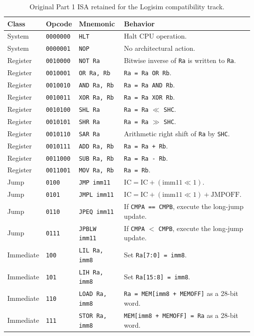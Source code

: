 \documentclass[12pt,a4paper]{article}
\begin{document}
\begin{table}[H]
\centering
\small
\caption{Original Part 1 ISA retained for the Logisim compatibility track.}
\begin{tabularx}{\linewidth}{|l|l|l|Y|}
\hline
\textbf{Class} & \textbf{Opcode} & \textbf{Mnemonic} & \textbf{Behavior} \\ \hline
System & \texttt{0000000} & \texttt{HLT} & Halt CPU operation. \\ \hline
System & \texttt{0000001} & \texttt{NOP} & No architectural action. \\ \hline
Register & \texttt{0010000} & \texttt{NOT Ra} & Bitwise inverse of \texttt{Ra} is written to \texttt{Ra}. \\ \hline
Register & \texttt{0010001} & \texttt{OR Ra, Rb} & \texttt{Ra = Ra OR Rb}. \\ \hline
Register & \texttt{0010010} & \texttt{AND Ra, Rb} & \texttt{Ra = Ra AND Rb}. \\ \hline
Register & \texttt{0010011} & \texttt{XOR Ra, Rb} & \texttt{Ra = Ra XOR Rb}. \\ \hline
Register & \texttt{0010100} & \texttt{SHL Ra} & \texttt{Ra = Ra} $\ll$ \texttt{SHC}. \\ \hline
Register & \texttt{0010101} & \texttt{SHR Ra} & \texttt{Ra = Ra} $\gg$ \texttt{SHC}. \\ \hline
Register & \texttt{0010110} & \texttt{SAR Ra} & Arithmetic right shift of \texttt{Ra} by \texttt{SHC}. \\ \hline
Register & \texttt{0010111} & \texttt{ADD Ra, Rb} & \texttt{Ra = Ra + Rb}. \\ \hline
Register & \texttt{0011000} & \texttt{SUB Ra, Rb} & \texttt{Ra = Ra - Rb}. \\ \hline
Register & \texttt{0011001} & \texttt{MOV Ra, Rb} & \texttt{Ra = Rb}. \\ \hline
Jump & \texttt{0100} & \texttt{JMP imm11} & $\mathrm{IC} = \mathrm{IC} + (\mathrm{imm11} \ll 1)$. \\ \hline
Jump & \texttt{0101} & \texttt{JMPL imm11} & $\mathrm{IC} = \mathrm{IC} + (\mathrm{imm11} \ll 1) + \mathrm{JMPOFF}$. \\ \hline
Jump & \texttt{0110} & \texttt{JPEQ imm11} & If \texttt{CMPA == CMPB}, execute the long-jump update. \\ \hline
Jump & \texttt{0111} & \texttt{JPBLW imm11} & If \texttt{CMPA} $<$ \texttt{CMPB}, execute the long-jump update. \\ \hline
Immediate & \texttt{100} & \texttt{LIL Ra, imm8} & Set \texttt{Ra[7:0] = imm8}. \\ \hline
Immediate & \texttt{101} & \texttt{LIH Ra, imm8} & Set \texttt{Ra[15:8] = imm8}. \\ \hline
Immediate & \texttt{110} & \texttt{LOAD Ra, imm8} & \texttt{Ra = MEM[imm8 + MEMOFF]} as a 28-bit word. \\ \hline
Immediate & \texttt{111} & \texttt{STOR Ra, imm8} & \texttt{MEM[imm8 + MEMOFF] = Ra} as a 28-bit word. \\ \hline
\end{tabularx}
\label{tab:old_isa_full}
\end{table}
\end{document}
